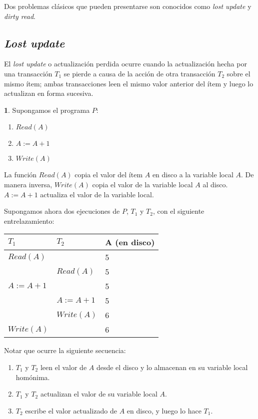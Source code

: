 \documentclass[english]{article}
\theoremstyle{definition}
\theoremstyle{definition}
\newtheorem{example}[thm]{\protect\examplename}
\providecommand{\examplename}{Ejemplo}
\begin{document}
Dos problemas clásicos que pueden presentarse son conocidos como \emph{lost
update} y \emph{dirty read}.

\subsection{\emph{Lost update}}

El \emph{lost update} o actualización perdida ocurre cuando la actualización
hecha por una transacción $T_1$ se pierde a causa de la acción de otra
transacción $T_2$ sobre el mismo ítem; ambas transacciones leen el mismo valor
anterior del ítem y luego lo actualizan en forma sucesiva.

\begin{example}
Supongamos el programa $P$:
\begin{enumerate}
    \item $Read(A)$
    \item $A := A + 1$
    \item $Write(A)$
\end{enumerate}

La función $Read(A)$ copia el valor del ítem $A$ en disco a la variable local
$A$. De manera inversa, $Write(A)$ copia el valor de la variable local $A$ al
disco. $A := A + 1$ actualiza el valor de la variable local.

Supongamos ahora dos ejecuciones de $P$, $T_1$ y $T_2$, con el siguiente
entrelazamiento:

\vspace{10pt}

\begin{tabular}{ l l l }
  $T_1$         & $T_2$         & A (en disco)  \\
  \hline
  $Read(A)$     &               & 5             \\
                & $Read(A)$     & 5             \\
  $A := A + 1$  &               & 5             \\
                & $A := A + 1$  & 5             \\
                & $Write(A)$    & 6             \\
  $Write(A)$    &               & 6             \\
\end{tabular}

\vspace{10pt}

Notar que ocurre la siguiente secuencia:
\begin{enumerate}
    \item $T_1$ y $T_2$ leen el valor de $A$ desde el disco y lo almacenan en
        su variable local homónima.
    \item $T_1$ y $T_2$ actualizan el valor de su variable local $A$.
    \item $T_2$ escribe el valor actualizado de $A$ en disco, y luego lo hace
        $T_1$.
\end{enumerate}


\end{example}
\end{document}
